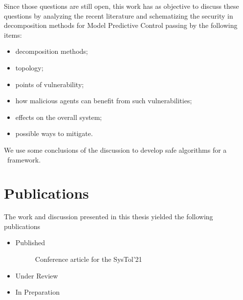 \documentclass[../main.tex]{subfiles}
\begin{document}
Since those questions are still open, this work has as objective to discuss these questions by analyzing the recent literature and schematizing the security in decomposition methods for Model Predictive Control passing by the following items:
\begin{itemize}[label=$\bullet$]
  \item decomposition methods;
  \item topology;
  \item points of vulnerability;
  \item how malicious agents can benefit from such vulnerabilities;
  \item effects on the overall system;
  \item possible ways to mitigate.
\end{itemize}
We use some conclusions of the discussion to develop safe algorithms for a \dmpc\ framework.

\section{Publications}
The work and discussion presented in this thesis yielded the following publications
\begin{itemize}
  \item Published
        \begin{description}
          \item[\cite{NogueiraEtAl2021}] Conference article for the SysTol'21
        \end{description}
  \item Under Review
  \item In Preparation
\end{itemize}



\printbibliography
\end{document}
